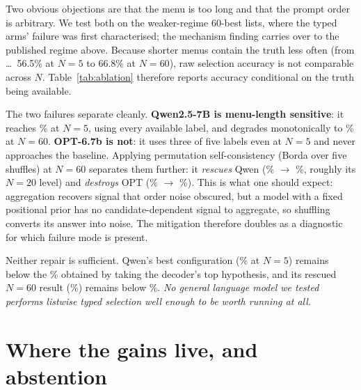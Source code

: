 \documentclass[11pt]{article}
\begin{document}
\begin{table}[t]
\centering\small

\caption{Accuracy \emph{conditional on the truth being present in the menu}, which differs
by $N$ and must be divided out. The italic row is the do-nothing baseline: take the
decoder's top hypothesis. Subset of 400 sentences. No configuration beats the decoder's
top hypothesis; permutation self-consistency rescues Qwen while destroying OPT.}
\label{tab:ablation}
\end{table}

Two obvious objections are that the menu is too long and that the prompt order is
arbitrary. We test both on the weaker-regime 60-best lists, where the typed arms' failure
was first characterised; the mechanism finding carries over to the published regime above.
Because shorter menus contain the truth less often (from \ldots\ 56.5\% at $N=5$ to 66.8\%
at $N=60$), raw selection accuracy is not comparable across $N$.
Table~\ref{tab:ablation} therefore reports accuracy conditional on the truth being available.

The two failures separate cleanly. \textbf{Qwen2.5-7B is menu-length sensitive}: it reaches
\qwenTypedAtFive\% at $N=5$, using every available label, and degrades monotonically to
\qwenTypedAtSixty\% at $N=60$. \textbf{OPT-6.7b is not}: it uses three of five labels even
at $N=5$ and never approaches the baseline. Applying permutation self-consistency
(Borda over five shuffles) at $N=60$ separates them further: it \emph{rescues} Qwen
(\qwenTypedAtSixty\% $\rightarrow$ \qwenBorda\%, roughly its $N=20$ level) and
\emph{destroys} OPT (\optTypedAtSixty\% $\rightarrow$ \optBorda\%). This is what one
should expect: aggregation recovers signal that order noise obscured, but a model with a
fixed positional prior has no candidate-dependent signal to aggregate, so shuffling
converts its answer into noise. The mitigation therefore doubles as a diagnostic for which
failure mode is present.

Neither repair is sufficient. Qwen's best configuration (\qwenTypedAtFive\% at $N=5$)
remains below the \baseAtFive\% obtained by taking the decoder's top hypothesis, and its
rescued $N=60$ result (\qwenBorda\%) remains below \baseAtSixty\%. \emph{No general
language model we tested performs listwise typed selection well enough to be worth running
at all.}

\section{Where the gains live, and abstention}
\label{sec:abstain}
\end{document}
